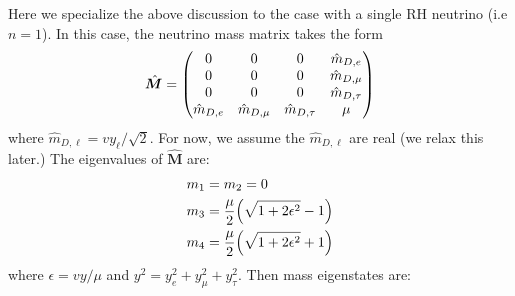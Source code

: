 
Here we specialize the above discussion to the case with a single RH neutrino (i.e
\(n=1\)). In this case, the neutrino mass matrix takes the form
\begin{align}
	\hat{\bm{M}} = \mqty(
	0             & 0               & 0                & \hat{m}_{D,e}    \\
	0             & 0               & 0                & \hat{m}_{D,\mu}  \\
	0             & 0               & 0                & \hat{m}_{D,\tau} \\
	\hat{m}_{D,e} & \hat{m}_{D,\mu} & \hat{m}_{D,\tau} & \mu              \\
	)
\end{align}
where \(\hat{m}_{D,\ell} = v y_{\ell}/\sqrt{2}\). For now, we assume the \(\hat{m}_{D,\ell}\)
are real (we relax this later.) The eigenvalues of
\(\hat{\bm{M}}\) are:
\begin{align}
	m_{1} & = m_{2} = 0                                     \\
	m_{3} & = \frac{\mu}{2}\qty(\sqrt{1 + 2\epsilon^{2}}-1) \\
	m_{4} & = \frac{\mu}{2}\qty(\sqrt{1 + 2\epsilon^{2}}+1)
\end{align}
where \(\epsilon=vy/\mu\) and \(y^{2}=y_{e}^{2}+y_{\mu}^{2}+y_{\tau}^{2}\).
Then mass eigenstates are:
